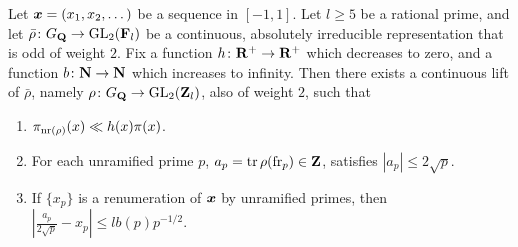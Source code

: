 \begin{theorem}
Let ${\boldsymbol x}=(x_1,x_2,\dots)$ be a sequence in $[-1,1]$. Let $l\geqslant 5$ be a 
rational prime, and let $\bar\rho\colon G_{\mathbf{Q}} \to \operatorname{GL}_2(\mathbf{F}_l)$ be a continuous, 
absolutely irreducible representation that is odd of weight $2$. Fix a function 
$h\colon \mathbf{R}^+ \to \mathbf{R}^+$ which decreases to zero, and a function 
$b\colon \mathbf{N} \to \mathbf{N}$ which increases to infinity. Then there exists a 
continuous lift of $\bar\rho$, namely  $\rho\colon G_{\mathbf{Q}}\to \operatorname{GL}_2(\mathbf{Z}_l)$, also 
of weight $2$, such that 
\begin{enumerate}
\item
$\pi_{\mathrm{nr}(\rho)}(x) \ll h(x) \pi(x)$.

\item
For each unramified prime $p$, $a_p = \operatorname{tr} \rho(\mathrm{fr}_p)\in \mathbf{Z}$, satisfies 
$|a_p| \leqslant 2\sqrt p$.

\item
If $\{x_p\}$ is a renumeration of ${\boldsymbol x}$ by unramified primes, then 
$\left|\frac{a_p}{2\sqrt p} - x_p\right| \leqslant l b(p) p^{-1/2}$. 
\end{enumerate}
\end{theorem}
